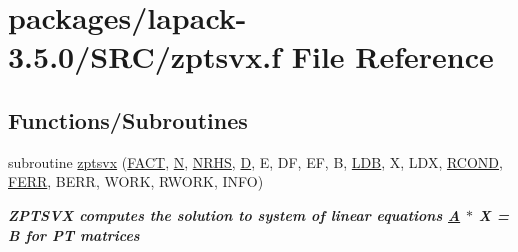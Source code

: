 \hypertarget{zptsvx_8f}{}\section{packages/lapack-\/3.5.0/\+S\+R\+C/zptsvx.f File Reference}
\label{zptsvx_8f}
\subsection*{Functions/\+Subroutines}
\begin{DoxyCompactItemize}
\item 
subroutine \hyperlink{group__complex16PTsolve_gafa2092d5080ff55f1dccd0eff869d286}{zptsvx} (\hyperlink{superlu__enum__consts_8h_af00a42ecad444bbda75cde1b64bd7e72a1b6692b56d378abb85bd49063721d034}{F\+A\+C\+T}, \hyperlink{polmisc_8c_a0240ac851181b84ac374872dc5434ee4}{N}, \hyperlink{example__user_8c_aa0138da002ce2a90360df2f521eb3198}{N\+R\+H\+S}, \hyperlink{odrpack_8h_a7dae6ea403d00f3687f24a874e67d139}{D}, E, D\+F, E\+F, B, \hyperlink{example__user_8c_a50e90a7104df172b5a89a06c47fcca04}{L\+D\+B}, X, L\+D\+X, \hyperlink{superlu__enum__consts_8h_af00a42ecad444bbda75cde1b64bd7e72a9b5c151728d8512307565994c89919d5}{R\+C\+O\+N\+D}, \hyperlink{superlu__enum__consts_8h_af00a42ecad444bbda75cde1b64bd7e72a78fd14d7abebae04095cfbe02928f153}{F\+E\+R\+R}, B\+E\+R\+R, W\+O\+R\+K, R\+W\+O\+R\+K, I\+N\+F\+O)
\begin{DoxyCompactList}\small\item\em {\bfseries  Z\+P\+T\+S\+V\+X computes the solution to system of linear equations \hyperlink{classA}{A} $\ast$ X = B for P\+T matrices} \end{DoxyCompactList}\end{DoxyCompactItemize}
